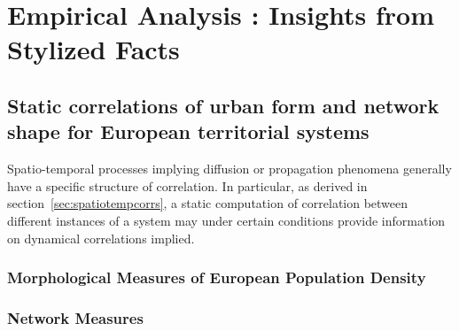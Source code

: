 


\chapter{Empirical Analysis : Insights from Stylized Facts} %

\label{ch:methodology} %















\section{Static correlations of urban form and network shape for European territorial systems}


Spatio-temporal processes implying diffusion or propagation phenomena generally have a specific structure of correlation. In particular, as derived in section~\ref{sec:spatiotempcorrs}, a static computation of correlation between different instances of a system may under certain conditions provide information on dynamical correlations implied.



\subsection{Morphological Measures of European Population Density}




\subsection{Network Measures}



